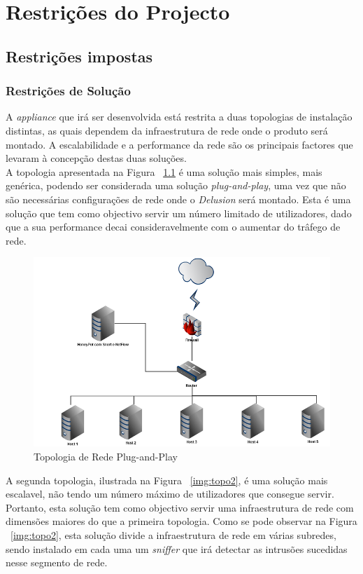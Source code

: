 \chapter{Restrições do Projecto}
\minitoc
\section{Restrições impostas}
\subsection{Restrições de Solução}
    A \textit{appliance} que irá ser desenvolvida está restrita a duas topologias de instalação distintas, as quais dependem da infraestrutura de rede onde o produto será montado. A escalabilidade e a performance da rede são os principais factores que levaram à concepção destas duas soluções. \\

    A topologia apresentada na Figura ~\ref{img:topo1} é uma solução mais simples, mais genérica, podendo ser considerada uma solução \textit{plug-and-play}, uma vez que não são necessárias configurações de rede onde o \textit{Delusion} será montado. Esta é uma solução que tem como objectivo servir um número limitado de utilizadores, dado que a sua performance decai consideravelmente com o aumentar do trâfego de rede. \\

\begin{figure}
	\centering	
	\includegraphics[scale=0.6]{images/topologia1.png}
	\caption{Topologia de Rede Plug-and-Play}
    \label{img:topo1}
\end{figure}

    A segunda topologia, ilustrada na Figura ~\ref{img:topo2}, é uma solução mais escalavel, não tendo um número máximo de utilizadores que consegue servir. Portanto, esta solução tem como objectivo servir uma infraestrutura de rede com dimensões maiores do que a primeira topologia. Como se pode observar na Figura ~\ref{img:topo2}, esta solução divide a infraestrutura de rede em várias subredes, sendo instalado em cada uma um \textit{sniffer} que irá detectar as intrusões sucedidas nesse segmento de rede.


